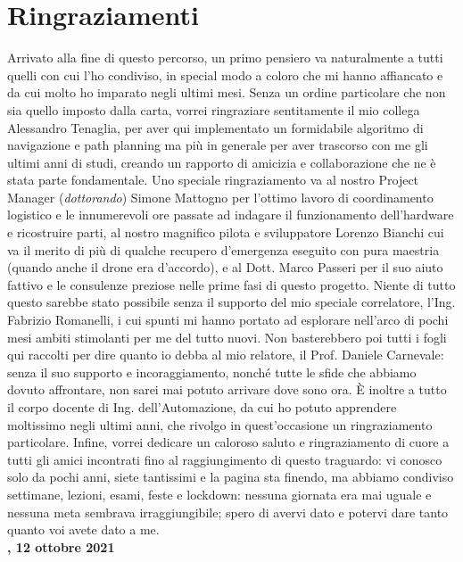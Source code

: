 
\fancyhf{}
\thispagestyle{plain}

\chapter{Ringraziamenti}
\fontsize{12}{12}\selectfont
\onehalfspacing
Arrivato alla fine di questo percorso, un primo pensiero va naturalmente a tutti quelli con cui l'ho condiviso, in special modo a coloro che mi hanno affiancato e da cui molto ho imparato negli ultimi mesi. Senza un ordine particolare che non sia quello imposto dalla carta, vorrei ringraziare sentitamente il mio collega Alessandro Tenaglia, per aver qui implementato un formidabile algoritmo di navigazione e path planning ma più in generale per aver trascorso con me gli ultimi anni di studi, creando un rapporto di amicizia e collaborazione che ne è stata parte fondamentale. Uno speciale ringraziamento va al nostro Project Manager (\emph{dottorando}) Simone Mattogno per l'ottimo lavoro di coordinamento logistico e le innumerevoli ore passate ad indagare il funzionamento dell'hardware e ricostruire parti, al nostro magnifico pilota e sviluppatore Lorenzo Bianchi cui va il merito di più di qualche recupero d'emergenza eseguito con pura maestria (quando anche il drone era d'accordo), e al Dott. Marco Passeri per il suo aiuto fattivo e le consulenze preziose nelle prime fasi di questo progetto. Niente di tutto questo sarebbe stato possibile senza il supporto del mio speciale correlatore, l'Ing. Fabrizio Romanelli, i cui spunti mi hanno portato ad esplorare nell'arco di pochi mesi ambiti stimolanti per me del tutto nuovi. Non basterebbero poi tutti i fogli qui raccolti per dire quanto io debba al mio relatore, il Prof. Daniele Carnevale: senza il suo supporto e incoraggiamento, nonché tutte le sfide che abbiamo dovuto affrontare, non sarei mai potuto arrivare dove sono ora. È inoltre a tutto il corpo docente di Ing. dell'Automazione, da cui ho potuto apprendere moltissimo negli ultimi anni, che rivolgo in quest'occasione un ringraziamento particolare. Infine, vorrei dedicare un caloroso saluto e ringraziamento di cuore a tutti gli amici incontrati fino al raggiungimento di questo traguardo: vi conosco solo da pochi anni, siete tantissimi e la pagina sta finendo, ma abbiamo condiviso settimane, lezioni, esami, feste e lockdown: nessuna giornata era mai uguale e nessuna meta sembrava irraggiungibile; spero di avervi dato e potervi dare tanto quanto voi avete dato a me.\\
\hspace*{\fill}\textbf{\autore, 12 ottobre 2021}
